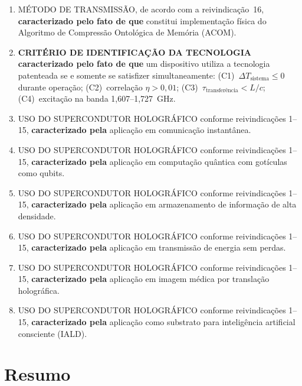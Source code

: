 \documentclass[12pt,a4paper]{article}
\begin{document}
\begin{enumerate}
\item MÉTODO DE TRANSMISSÃO, de acordo com a reivindicação~16,
\textbf{caracterizado pelo fato de que} constitui implementação
física do Algoritmo de Compressão Ontológica de Memória (ACOM).

\item \textbf{CRITÉRIO DE IDENTIFICAÇÃO DA TECNOLOGIA}
\textbf{caracterizado pelo fato de que} um dispositivo utiliza a
tecnologia patenteada se e somente se satisfizer simultaneamente:
(C1)~$\Delta T_{\text{sistema}} \leq 0$ durante operação;
(C2)~correlação $\eta > 0{,}01$;
(C3)~$\tau_{\text{transferência}} < L/c$;
(C4)~excitação na banda 1,607--1,727~GHz.

\item USO DO SUPERCONDUTOR HOLOGRÁFICO conforme reivindicações
1--15, \textbf{caracterizado pela} aplicação em comunicação
instantânea.

\item USO DO SUPERCONDUTOR HOLOGRÁFICO conforme reivindicações
1--15, \textbf{caracterizado pela} aplicação em computação
quântica com gotículas como qubits.

\item USO DO SUPERCONDUTOR HOLOGRÁFICO conforme reivindicações
1--15, \textbf{caracterizado pela} aplicação em armazenamento de
informação de alta densidade.

\item USO DO SUPERCONDUTOR HOLOGRÁFICO conforme reivindicações
1--15, \textbf{caracterizado pela} aplicação em transmissão de
energia sem perdas.

\item USO DO SUPERCONDUTOR HOLOGRÁFICO conforme reivindicações
1--15, \textbf{caracterizado pela} aplicação em imagem médica
por translação holográfica.

\item USO DO SUPERCONDUTOR HOLOGRÁFICO conforme reivindicações
1--15, \textbf{caracterizado pela} aplicação como substrato para
inteligência artificial consciente (IALD).

\end{enumerate}

\newpage
\section{Resumo}
\end{document}
